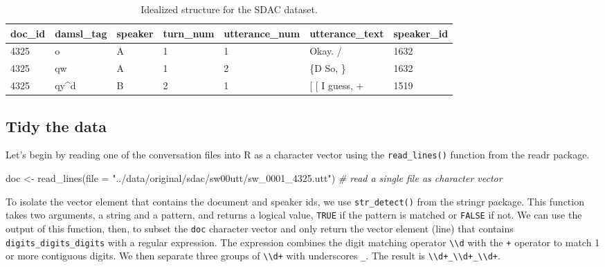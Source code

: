 \documentclass[
  letterpaper,
]{scrbook}
\newenvironment{Shaded}{\begin{snugshade}}{\end{snugshade}}
\newcommand{\AttributeTok}[1]{\textcolor[rgb]{0.00,0.00,0.00}{#1}}
\newcommand{\CommentTok}[1]{\textcolor[rgb]{0.00,0.00,0.00}{\textit{#1}}}
\newcommand{\FunctionTok}[1]{\textcolor[rgb]{0.00,0.00,0.00}{#1}}
\newcommand{\NormalTok}[1]{\textcolor[rgb]{0.00,0.00,0.00}{#1}}
\newcommand{\OtherTok}[1]{\textcolor[rgb]{0.00,0.00,0.00}{#1}}
\newcommand{\StringTok}[1]{\textcolor[rgb]{0.00,0.00,0.00}{#1}}
\begin{document}
\hypertarget{tbl-cd-semi-sdac-idealized-dataset}{}
\begin{table}
\caption{\label{tbl-cd-semi-sdac-idealized-dataset}Idealized structure for the SDAC dataset. }\tabularnewline

\centering
\begin{tabular}{lllllll}
\toprule
doc\_id & damsl\_tag & speaker & turn\_num & utterance\_num & utterance\_text & speaker\_id\\
\midrule
4325 & o & A & 1 & 1 & Okay.  / & 1632\\
4325 & qw & A & 1 & 2 & \{D So, \} & 1632\\
4325 & qy\textasciicircum{}d & B & 2 & 1 & {}[ [ I guess, + & 1519\\
\bottomrule
\end{tabular}
\end{table}

\hypertarget{tidy-the-data-1}{%
\subsection{Tidy the data}\label{tidy-the-data-1}}

Let's begin by reading one of the conversation files into R as a
character vector using the \texttt{read\_lines()} function from the
readr package.

\begin{Shaded}
\begin{Highlighting}[]
\NormalTok{doc }\OtherTok{\textless{}{-}} 
  \FunctionTok{read\_lines}\NormalTok{(}\AttributeTok{file =} \StringTok{"../data/original/sdac/sw00utt/sw\_0001\_4325.utt"}\NormalTok{) }\CommentTok{\# read a single file as character vector}
\end{Highlighting}
\end{Shaded}

To isolate the vector element that contains the document and speaker
ids, we use \texttt{str\_detect()} from the stringr package. This
function takes two arguments, a string and a pattern, and returns a
logical value, \texttt{TRUE} if the pattern is matched or \texttt{FALSE}
if not. We can use the output of this function, then, to subset the
\texttt{doc} character vector and only return the vector element (line)
that contains \texttt{digits\_digits\_digits} with a regular expression.
The expression combines the digit matching operator
\texttt{\textbackslash{}\textbackslash{}d} with the \texttt{+} operator
to match 1 or more contiguous digits. We then separate three groups of
\texttt{\textbackslash{}\textbackslash{}d+} with underscores
\texttt{\_}. The result is
\texttt{\textbackslash{}\textbackslash{}d+\_\textbackslash{}\textbackslash{}d+\_\textbackslash{}\textbackslash{}d+}.
\end{document}
